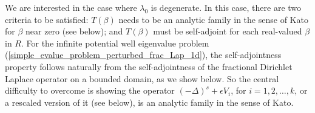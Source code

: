 \documentclass[preprint,12pt]{elsarticle}
\begin{document}
We are interested in the case where $\lambda_0$ is degenerate. In this case, there are two criteria to be satisfied: $T(\beta)$ needs to be an analytic family in the sense of Kato for $\beta$ near zero (see below); and $T(\beta)$ must be self-adjoint for each real-valued $\beta$ in $R$.
For the infinite potential well eigenvalue problem (\ref{simple_evalue_problem_perturbed_frac_Lap_1d}), the self-adjointness property follows naturally from the self-adjointness of the fractional Dirichlet Laplace operator on a bounded domain, as we show below. So the central difficulty to overcome is showing the operator $(-\Delta)^s+\epsilon V_i$, for $i=1,2,\ldots,k$, or a rescaled version of it (see below), is an analytic family in the sense of Kato. 
\end{document}
